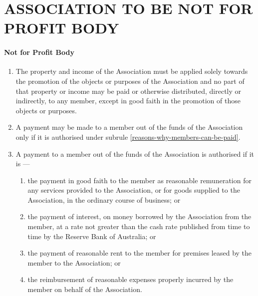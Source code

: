 \documentclass[../constitution.tex]{subfiles}
\begin{document}
\part{ASSOCIATION TO BE NOT FOR PROFIT BODY} \label{part-2-association-to-be-not-for-profit-body}


\subsection{Not for Profit Body} \label{not-for-profit-body} 

\begin{enumerate}

\item The property and income of the Association must be applied solely towards the promotion of the objects or purposes of the Association and no part of that property or income may be paid or otherwise distributed, directly or indirectly, to any member, except in good faith in the promotion of those objects or purposes.
\item A payment may be made to a member out of the funds of the Association only if it is authorised under subrule \ref{reasons-why-members-can-be-paid}.
\item A payment to a member out of the funds of the Association is authorised if it is ---

  \begin{enumerate} \label{reasons-why-members-can-be-paid}
  \item the payment in good faith to the member as reasonable remuneration for any services provided to the Association, or for goods supplied to the Association, in the ordinary course of business; or
  \item the payment of interest, on money borrowed by the Association from the member, at a rate not greater than the cash rate published from time to time by the Reserve Bank of Australia; or
  \item the payment of reasonable rent to the member for premises leased by the member to the Association; or
  \item the reimbursement of reasonable expenses properly incurred by the member on behalf of the Association.
  \end{enumerate}
\end{enumerate}

\end{document}
